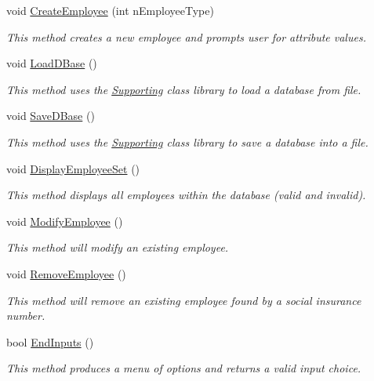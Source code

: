\begin{DoxyCompactItemize}
void \hyperlink{class_presentation_1_1_u_i_menu_a7c07cacad1ee89f648e1ae27df3c862b}{Create\-Employee} (int n\-Employee\-Type)
\begin{DoxyCompactList}\small\item\em This method creates a new employee and prompts user for attribute values. \end{DoxyCompactList}\item 
void \hyperlink{class_presentation_1_1_u_i_menu_ae43fc043b977d70007d01b20ada8d532}{Load\-D\-Base} ()
\begin{DoxyCompactList}\small\item\em This method uses the \hyperlink{namespace_supporting}{Supporting} class library to load a database from file. \end{DoxyCompactList}\item 
void \hyperlink{class_presentation_1_1_u_i_menu_a94a2ad97db7a33ea6d46fd857f7a917e}{Save\-D\-Base} ()
\begin{DoxyCompactList}\small\item\em This method uses the \hyperlink{namespace_supporting}{Supporting} class library to save a database into a file. \end{DoxyCompactList}\item 
void \hyperlink{class_presentation_1_1_u_i_menu_a11ff77505d7c1172b450204ebaa27d4f}{Display\-Employee\-Set} ()
\begin{DoxyCompactList}\small\item\em This method displays all employees within the database (valid and invalid). \end{DoxyCompactList}\item 
void \hyperlink{class_presentation_1_1_u_i_menu_aa4d5c581279a835c28680355f8ab21d7}{Modify\-Employee} ()
\begin{DoxyCompactList}\small\item\em This method will modify an existing employee. \end{DoxyCompactList}\item 
void \hyperlink{class_presentation_1_1_u_i_menu_a24af95820f9c6a544542b7f262013692}{Remove\-Employee} ()
\begin{DoxyCompactList}\small\item\em This method will remove an existing employee found by a social insurance number. \end{DoxyCompactList}\item 
bool \hyperlink{class_presentation_1_1_u_i_menu_a39859e6f0c0f965d5d941381249833c9}{End\-Inputs} ()
\begin{DoxyCompactList}\small\item\em This method produces a menu of options and returns a valid input choice. \end{DoxyCompactList}\end{DoxyCompactItemize}


